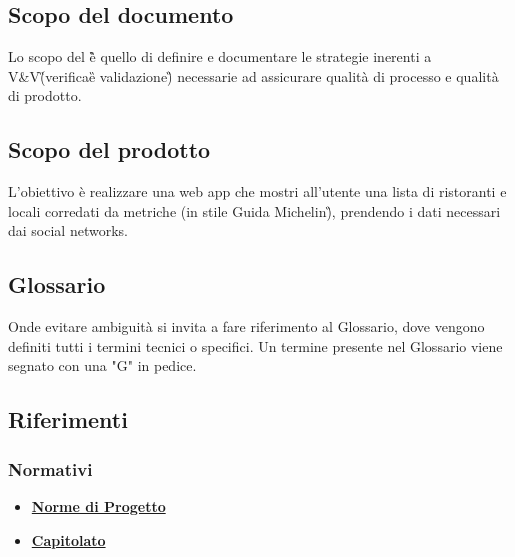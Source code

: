 \subsection{Scopo del documento}
Lo scopo del \PdQ{}\G è quello di definire e documentare le strategie inerenti a V\&V\G (verifica\G
e validazione\G) necessarie ad assicurare qualità di processo e qualità di prodotto.

\subsection{Scopo del prodotto}
L'obiettivo è realizzare una web app che mostri all'utente una lista di ristoranti e locali 
corredati da metriche (in stile Guida Michelin\G), prendendo i dati necessari dai social networks.

\subsection{Glossario}
Onde evitare ambiguità si invita a fare riferimento al Glossario, dove vengono definiti tutti 
i termini tecnici o specifici. Un termine presente nel Glossario viene segnato con una "G" in pedice.

\subsection{Riferimenti}
\subsubsection{Normativi}
\begin{itemize}
    \item \href{https://github.com/Bug-s-Bunny-Team/docs/tree/master/src/Interni/Norme_Di_Progetto}{\textbf{Norme di Progetto}}
    \item \href{https://www.math.unipd.it/~tullio/IS-1/2021/Progetto/C4p.pdf}{\textbf{Capitolato}}
\end{itemize}

